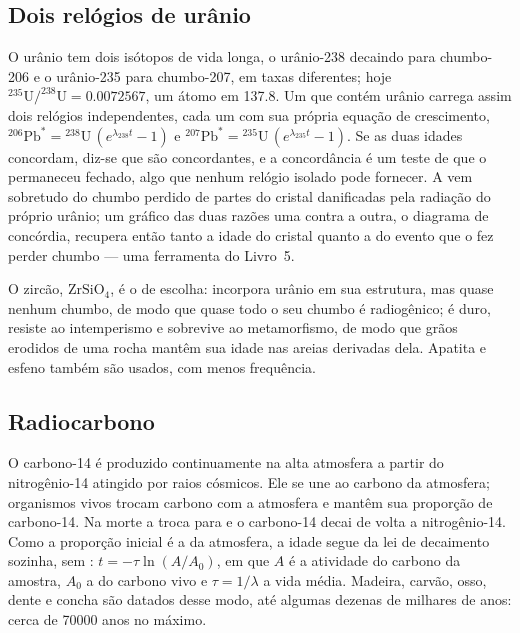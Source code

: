 \subsection*{Dois relógios de urânio}

O urânio tem dois isótopos de vida longa, o urânio-238 decaindo para chumbo-206 e o urânio-235
para chumbo-207, em taxas diferentes; hoje $^{235}\mathrm{U}/^{238}\mathrm{U} = 0.0072567$, um
átomo em 137.8. Um  que contém urânio carrega assim dois relógios independentes, cada um
com sua própria equação de crescimento, ${}^{206}\mathrm{Pb}^* = {}^{238}\mathrm{U}\,(e^{\lambda_{238} t} - 1)$
e ${}^{207}\mathrm{Pb}^* = {}^{235}\mathrm{U}\,(e^{\lambda_{235} t} - 1)$. Se as duas idades
concordam, diz-se que são concordantes, e a concordância é um teste de que o  permaneceu
fechado, algo que nenhum relógio isolado pode fornecer. A  vem sobretudo do chumbo
perdido de partes do cristal danificadas pela radiação do próprio urânio; um gráfico das duas
razões uma contra a outra, o diagrama de concórdia, recupera então tanto a idade do cristal
quanto a do evento que o fez perder chumbo --- uma ferramenta do Livro~5.

O zircão, $\mathrm{ZrSiO_4}$, é o  de escolha: incorpora urânio em sua estrutura, mas
quase nenhum chumbo, de modo que quase todo o seu chumbo é radiogênico; é duro, resiste ao
intemperismo e sobrevive ao metamorfismo, de modo que grãos erodidos de uma rocha mantêm sua
idade nas areias derivadas dela. Apatita e esfeno também são usados, com menos frequência.

\subsection*{Radiocarbono}

O carbono-14 é produzido continuamente na alta atmosfera a partir do nitrogênio-14 atingido por
raios cósmicos. Ele se une ao carbono da atmosfera; organismos vivos trocam carbono com a
atmosfera e mantêm sua proporção de carbono-14. Na morte a troca para e o carbono-14 decai de
volta a nitrogênio-14. Como a proporção inicial é a da atmosfera, a idade segue da lei de
decaimento sozinha, sem : $t = -\tau \ln(A/A_0)$, em que $A$ é a atividade do carbono da
amostra, $A_0$ a do carbono vivo e $\tau =
1/\lambda$ a vida média. Madeira, carvão, osso, dente e concha são datados desse modo, até
algumas dezenas de milhares de anos: cerca de \num{70000} anos no máximo.

